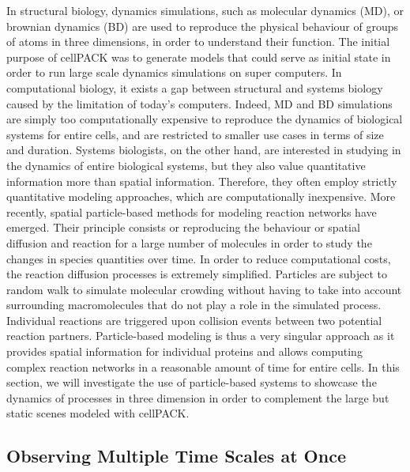 In structural biology, dynamics simulations, such as molecular dynamics (MD), or brownian dynamics (BD) are used to reproduce the physical behaviour of groups of atoms in three dimensions, in order to understand their function.
The initial purpose of cellPACK was to generate models that could serve as initial state in order to run large scale dynamics simulations on super computers.
In computational biology, it exists a gap between structural and systems biology caused by the limitation of today's computers.
Indeed, MD and BD simulations are simply too computationally expensive to reproduce the dynamics of biological systems for entire cells, and are restricted to smaller use cases in terms of size and duration.
Systems biologists, on the other hand, are interested in studying in the dynamics of entire biological systems, but they also value quantitative information more than spatial information.
Therefore, they often employ strictly quantitative modeling approaches, which are computationally inexpensive.
More recently, spatial particle-based methods for modeling reaction networks have emerged.
Their principle consists or reproducing the behaviour or spatial diffusion and reaction for a large number of molecules in order to study the changes in species quantities over time.
In order to reduce computational costs, the reaction diffusion processes is extremely simplified.
Particles are subject to random walk to simulate molecular crowding without having to take into account surrounding macromolecules that do not play a role in the simulated process.
Individual reactions are triggered upon collision events between two potential reaction partners.
Particle-based modeling is thus a very singular approach as it provides spatial information for individual proteins and allows computing complex reaction networks in a reasonable amount of time for entire cells.
In this section, we will investigate the use of particle-based systems to showcase the dynamics of processes in three dimension in order to complement the large but static scenes modeled with cellPACK. 

\subsection{Observing Multiple Time Scales at Once}

